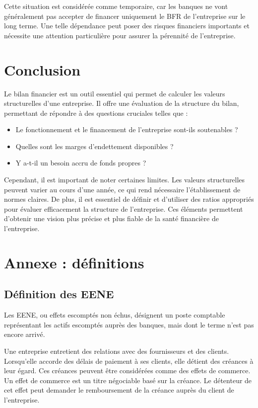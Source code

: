 \documentclass[a4paper, 12pt]{report}
\begin{document}
Cette situation est considérée comme temporaire, car les banques ne vont généralement pas accepter de financer uniquement le BFR de l'entreprise sur le long terme. Une telle dépendance peut poser des risques financiers importants et nécessite une attention particulière pour assurer la pérennité de l'entreprise.

\section{Conclusion}

Le bilan financier est un outil essentiel qui permet de calculer les valeurs structurelles d'une entreprise. Il offre une évaluation de la structure du bilan, permettant de répondre à des questions cruciales telles que :

\begin{itemize}
	\item Le fonctionnement et le financement de l'entreprise sont-ils soutenables ?
	\item Quelles sont les marges d'endettement disponibles ?
	\item Y a-t-il un besoin accru de fonds propres ?
\end{itemize}

Cependant, il est important de noter certaines limites. Les valeurs structurelles peuvent varier au cours d'une année, ce qui rend nécessaire l'établissement de normes claires. De plus, il est essentiel de définir et d'utiliser des ratios appropriés pour évaluer efficacement la structure de l'entreprise. Ces éléments permettent d'obtenir une vision plus précise et plus fiable de la santé financière de l'entreprise.

\section{Annexe : définitions}

\subsection{Définition des EENE}

Les EENE, ou effets escomptés non échus, désignent un poste comptable représentant les actifs escomptés auprès des banques, mais dont le terme n'est pas encore arrivé. 

Une entreprise entretient des relations avec des fournisseurs et des clients. Lorsqu'elle accorde des délais de paiement à ses clients, elle détient des créances à leur égard. Ces créances peuvent être considérées comme des effets de commerce. Un effet de commerce est un titre négociable basé sur la créance. Le détenteur de cet effet peut demander le remboursement de la créance auprès du client de l'entreprise. 
\end{document}
